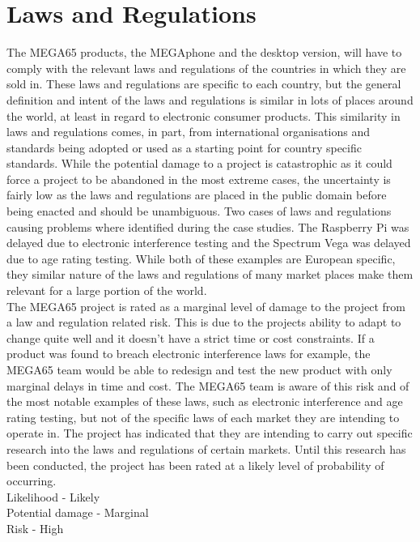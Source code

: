 \section{Laws and Regulations}
The MEGA65 products, the MEGAphone and the desktop version, will have to comply with the relevant laws and regulations of the countries in which they are sold in. These laws and regulations are specific to each country, but the general definition and intent of the laws and regulations is similar in lots of places around the world, at least in regard to electronic consumer products. This similarity in laws and regulations comes, in part, from international organisations and standards being adopted or used as a starting point for country specific standards. While the potential damage to a project is catastrophic as it could force a project to be abandoned in the most extreme cases, the uncertainty is fairly low as the laws and regulations are placed in the public domain before being enacted and should be unambiguous. Two cases of laws and regulations causing problems where identified during the case studies. The Raspberry Pi was delayed due to electronic interference testing and the Spectrum Vega was delayed due to age rating testing. While both of these examples are European specific, they similar nature of the laws and regulations of many market places make them relevant for a large portion of the world. \\

The MEGA65 project is rated as a marginal level of damage to the project from a law and regulation related risk. This is due to the projects ability to adapt to change quite well and it doesn't have a strict time or cost constraints. If a product was found to breach electronic interference laws for example, the MEGA65 team would be able to redesign and test the new product with only marginal delays in time and cost. The MEGA65 team is aware of this risk and of the most notable examples of these laws, such as electronic interference and age rating testing, but not of the specific laws of each market they are intending to operate in. The project has indicated that they are intending to carry out specific research into the laws and regulations of certain markets. Until this research has been conducted, the project has been rated at a likely level of probability of occurring.  \\

Likelihood - Likely   \\
Potential damage - Marginal \\
Risk - High \\


